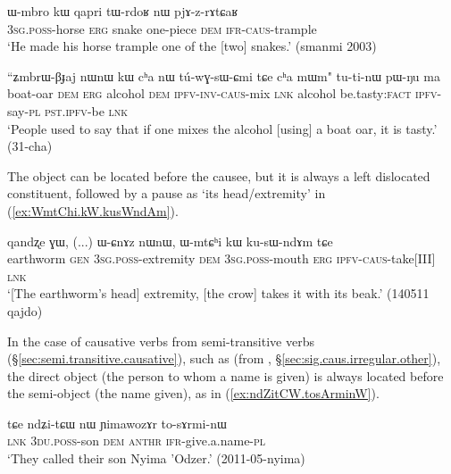 \begin{exe}
\ex \label{ex:Wmbro.kW.pjAzrAtCaR}
\gll ɯ-mbro kɯ qapri tɯ-rdoʁ nɯ pjɤ-z-rɤtɕaʁ \\
\textsc{3sg}.\textsc{poss}-horse \textsc{erg} snake one-piece \textsc{dem} \textsc{ifr}-\textsc{caus}-trample \\
\glt `He made his horse trample one of the [two] snakes.' (smanmi 2003)
\end{exe}
\largerpage
\begin{exe}
\ex \label{ex:ZmbrWBJaj.kW.tuwGsWCmi}
\gll ``ʑmbrɯ-βɟaj nɯnɯ kɯ cʰa nɯ tú-wɣ-sɯ-ɕmi tɕe cʰa mɯm" tu-ti-nɯ pɯ-ŋu ma \\
boat-oar \textsc{dem} \textsc{erg} alcohol \textsc{dem} \textsc{ipfv}-\textsc{inv}-\textsc{caus}-mix \textsc{lnk} alcohol be.tasty:\textsc{fact} \textsc{ipfv}-say-\textsc{pl} \textsc{pst}.\textsc{ipfv}-be \textsc{lnk} \\
\glt `People used to say that if one mixes the alcohol [using] a boat oar, it is tasty.' (31-cha)
\end{exe}

The object can be located before the causee, but it is always a left dislocated constituent, followed by a pause as  `its head/extremity' in (\ref{ex:WmtChi.kW.kusWndAm}).

\begin{exe}
\ex \label{ex:WmtChi.kW.kusWndAm}
\gll  qandʐe ɣɯ, (...) ɯ-ɕnɤz nɯnɯ, ɯ-mtɕʰi kɯ ku-sɯ-ndɤm tɕe \\
earthworm \textsc{gen} {  } \textsc{3sg}.\textsc{poss}-extremity \textsc{dem} \textsc{3sg}.\textsc{poss}-mouth \textsc{erg} \textsc{ipfv}-\textsc{caus}-take[III] \textsc{lnk} \\
\glt `[The earthworm's head] extremity, [the crow] takes it with its beak.' (140511 qajdo)
\end{exe}

In the case of causative verbs from semi-transitive verbs (§\ref{sec:semi.transitive.causative}), such as  (from , §\ref{sec:sig.caus.irregular.other}),  the direct object (the person to whom a name is given) is always located before the semi-object (the name given), as in (\ref{ex:ndZitCW.tosArminW}).

\begin{exe}
\ex \label{ex:ndZitCW.tosArminW}
\gll tɕe ndʑi-tɕɯ nɯ ɲimawozɤr to-sɤrmi-nɯ \\
\textsc{lnk} \textsc{3du}.\textsc{poss}-son \textsc{dem}  \textsc{anthr} \textsc{ifr}-give.a.name-\textsc{pl} \\
\glt `They called their son Nyima 'Odzer.' (2011-05-nyima)
\end{exe}

